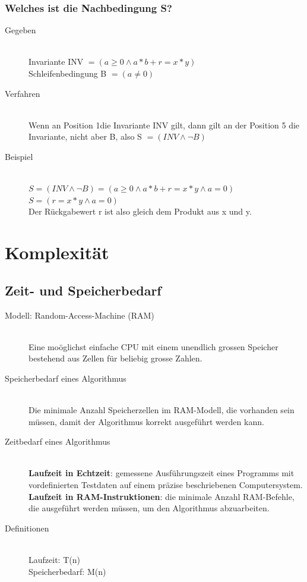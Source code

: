 \documentclass[a4paper,10pt]{article}
\newcommand{\Bold}[1]{\textbf{#1}} %
\begin{document}
\subsubsection{Welches ist die Nachbedingung S?}
\begin{description}
	\item[Gegeben] \hfill \\
		Invariante INV $= (a \geq 0 \wedge a*b + r = x*y)$ \\
		Schleifenbedingung B $= (a \neq 0)$
	\item[Verfahren] \hfill \\
		Wenn an Position 1die Invariante INV gilt, dann gilt an der Position 5 die Invariante, nicht aber B, also S $= (INV \wedge \neg B)$
	\item[Beispiel] \hfill \\
		$S = (INV \wedge \neg B) = (a \geq 0 \wedge a*b + r = x*y \wedge a = 0)$ \\
		$S = (r = x*y \wedge a = 0)$ \\
		Der R\"uckgabewert r ist also gleich dem Produkt aus x und y.
\end{description}

\newpage
\section{Komplexit\"at}

\subsection{Zeit- und Speicherbedarf}
\begin{description}
	\item[Modell: Random-Access-Machine (RAM)] \hfill \\
		Eine mo\"oglichst einfache CPU mit einem unendlich grossen Speicher bestehend aus Zellen für beliebig grosse Zahlen.
		\item[Speicherbedarf eines Algorithmus] \hfill \\
			Die minimale Anzahl Speicherzellen im RAM-Modell, die vorhanden sein m\"ussen, damit der Algorithmus korrekt ausgef\"uhrt werden kann.
		\item[Zeitbedarf eines Algorithmus] \hfill \\
			\Bold {Laufzeit in Echtzeit}: gemessene Ausf\"uhrungszeit eines Programms mit vordefinierten Testdaten auf einem pr\"azise beschriebenen Computersystem. \\
			\Bold {Laufzeit in RAM-Instruktionen}: die minimale Anzahl RAM-Befehle, die ausgef\"uhrt werden m\"ussen, um den Algorithmus abzuarbeiten.
		\item[Definitionen] \hfill \\
			Laufzeit: T(n) \\
			Speicherbedarf: M(n)
\end{description}
\end{document}
